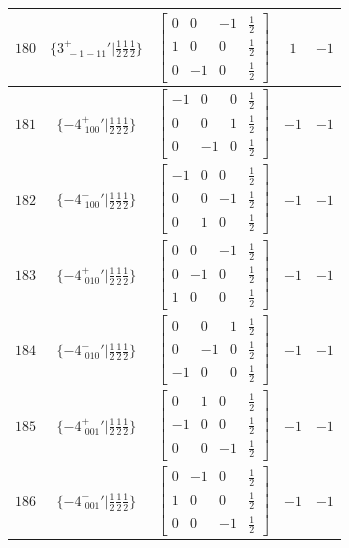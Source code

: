 \documentclass[fleqn,8pt]{jsarticle}
\begin{document}
\begin{longtable}{ccccc}
$ 180 $ & $ \{3^{+}_{\,\,-1-11}{}'|\frac{1}{2} \frac{1}{2} \frac{1}{2}\} $ & $ \begin{bmatrix} 0 & 0 & -1 & \frac{1}{2} \\ 1 & 0 & 0 & \frac{1}{2} \\ 0 & -1 & 0 & \frac{1}{2} \end{bmatrix} $ & $ 1 $ & $ -1 $ \\ \hline
$ 181 $ & $ \{-4^{+}_{\,\,100}{}'|\frac{1}{2} \frac{1}{2} \frac{1}{2}\} $ & $ \begin{bmatrix} -1 & 0 & 0 & \frac{1}{2} \\ 0 & 0 & 1 & \frac{1}{2} \\ 0 & -1 & 0 & \frac{1}{2} \end{bmatrix} $ & $ -1 $ & $ -1 $ \\ \hline
$ 182 $ & $ \{-4^{-}_{\,\,100}{}'|\frac{1}{2} \frac{1}{2} \frac{1}{2}\} $ & $ \begin{bmatrix} -1 & 0 & 0 & \frac{1}{2} \\ 0 & 0 & -1 & \frac{1}{2} \\ 0 & 1 & 0 & \frac{1}{2} \end{bmatrix} $ & $ -1 $ & $ -1 $ \\ \hline
$ 183 $ & $ \{-4^{+}_{\,\,010}{}'|\frac{1}{2} \frac{1}{2} \frac{1}{2}\} $ & $ \begin{bmatrix} 0 & 0 & -1 & \frac{1}{2} \\ 0 & -1 & 0 & \frac{1}{2} \\ 1 & 0 & 0 & \frac{1}{2} \end{bmatrix} $ & $ -1 $ & $ -1 $ \\ \hline
$ 184 $ & $ \{-4^{-}_{\,\,010}{}'|\frac{1}{2} \frac{1}{2} \frac{1}{2}\} $ & $ \begin{bmatrix} 0 & 0 & 1 & \frac{1}{2} \\ 0 & -1 & 0 & \frac{1}{2} \\ -1 & 0 & 0 & \frac{1}{2} \end{bmatrix} $ & $ -1 $ & $ -1 $ \\ \hline
$ 185 $ & $ \{-4^{+}_{\,\,001}{}'|\frac{1}{2} \frac{1}{2} \frac{1}{2}\} $ & $ \begin{bmatrix} 0 & 1 & 0 & \frac{1}{2} \\ -1 & 0 & 0 & \frac{1}{2} \\ 0 & 0 & -1 & \frac{1}{2} \end{bmatrix} $ & $ -1 $ & $ -1 $ \\ \hline
$ 186 $ & $ \{-4^{-}_{\,\,001}{}'|\frac{1}{2} \frac{1}{2} \frac{1}{2}\} $ & $ \begin{bmatrix} 0 & -1 & 0 & \frac{1}{2} \\ 1 & 0 & 0 & \frac{1}{2} \\ 0 & 0 & -1 & \frac{1}{2} \end{bmatrix} $ & $ -1 $ & $ -1 $ \\ \hline

\end{longtable}
\end{document}
